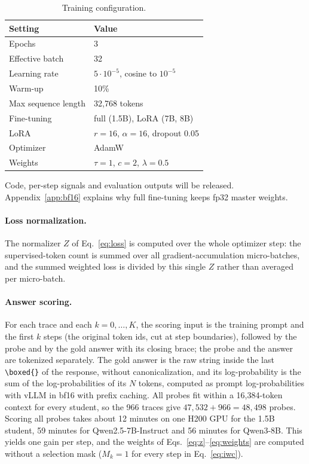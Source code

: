 \documentclass[11pt]{article}
\newcommand{\boxedtok}{\texttt{\textbackslash boxed\{\}}}
\begin{document}
\begin{table}[h]
  \centering
  \small
  \begin{tabular}{ll}
    \toprule
    Setting & Value \\
    \midrule
    Epochs & 3 \\
    Effective batch & 32 \\
    Learning rate & $5\cdot10^{-5}$, cosine to $10^{-5}$ \\
    Warm-up & 10\% \\
    Max sequence length & 32,768 tokens \\
    Fine-tuning & full (1.5B), LoRA (7B, 8B) \\
    LoRA & $r=16$, $\alpha=16$, dropout 0.05 \\
    Optimizer & AdamW \\
    Weights & $\tau=1$, $c=2$, $\lambda=0.5$ \\
    \bottomrule
  \end{tabular}
  \caption{Training configuration.}
  \label{tab:hparams}
\end{table}

Code, per-step signals and evaluation outputs will be released.
Appendix~\ref{app:bf16} explains why full fine-tuning keeps fp32 master weights.
\paragraph{Loss normalization.}
The normalizer $Z$ of Eq.~\ref{eq:loss} is computed over the whole optimizer step: the supervised-token count is summed over all gradient-accumulation micro-batches, and the summed weighted loss is divided by this single $Z$ rather than averaged per micro-batch.

\paragraph{Answer scoring.}
For each trace and each $k=0,\dots,K$, the scoring input is the training prompt and the first $k$ steps (the original token ids, cut at step boundaries), followed by the probe and by the gold answer with its closing brace; the probe and the answer are tokenized separately.
The gold answer is the raw string inside the last \boxedtok{} of the response, without canonicalization, and its log-probability is the sum of the log-probabilities of its $N$ tokens, computed as prompt log-probabilities with vLLM \citep{kwon2023vllm} in bf16 with prefix caching.
All probes fit within a 16,384-token context for every student, so the 966 traces give $47{,}532+966=48{,}498$ probes.
Scoring all probes takes about 12 minutes on one H200 GPU for the 1.5B student, 59 minutes for Qwen2.5-7B-Instruct and 56 minutes for Qwen3-8B.
This yields one gain per step, and the weights of Eqs.~\ref{eq:z}--\ref{eq:weights} are computed without a selection mask ($M_k=1$ for every step in Eq.~\ref{eq:iwc}).
\end{document}
